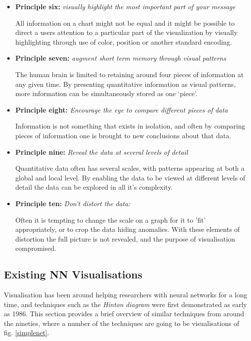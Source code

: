 \documentclass[a4paper,11pt,titlepage]{article}
\begin{document}
\begin{itemize}
		\item \textbf{Principle six:} \textit{visually highlight the most important part of your message}
		\par 
		All information on a chart might not be equal and it might be possible to direct a users attention to a particular part of the visualization by visually highlighting through use of color, position or another standard encoding.

		\item \textbf{Principle seven:} 
		\textit{augment short term memory through visual patterns}
		\par
		The human brain is limited to retaining around four pieces of information at any given time. By presenting quantitative information as visual patterns, more information can be simultaneously stored as one `piece'.
	\item \textbf{Principle eight:}
	\textit{Encourage the eye to compare different pieces of data}
	\par
	Information is not something that exists in isolation, and often by comparing pieces of information one is brought to new conclusions about that data.
	\item \textbf{Principle nine:}
	\textit{Reveal the data at several levels of detail}
	\par
	Quantitative data often has several scales, with patterns appearing at both a global and local level. By enabling the data to be viewed at different levels of detail the data can be explored in all it's complexity.
	\item \textbf{Principle ten:}
	\textit{Don't distort the data:}
	\par
	Often it is tempting to change the scale on a graph for it to 'fit' appropriately, or to crop the data hiding anomalies. With these elements of distortion the full picture is not revealed, and the purpose of visualisation compromised. 
	\end{itemize}
\subsection{Existing NN Visualisations}
		
	 Visualisation has been around helping researchers with neural networks for a long time, and techniques such as the \textit{Hinton diagram} were first demonstrated as early as 1986. This section provides a brief overview of similar techniques from around the nineties, where a number of the techniques are going to be visualisations of fig. \ref{simplenet}.
	 
\end{document}
